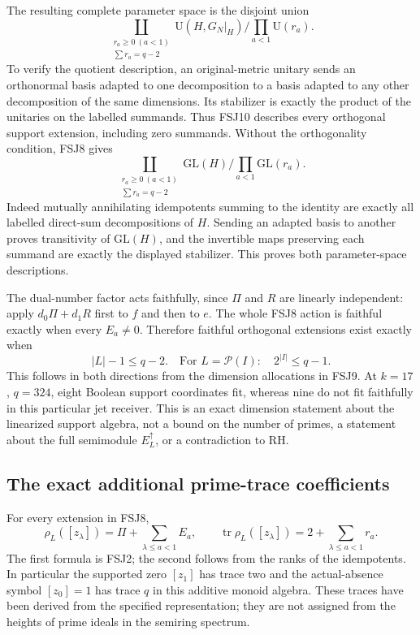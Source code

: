 \documentclass[11pt]{article}
\begin{document}
The resulting complete parameter space is the disjoint union
\[
\coprod_{\substack{r_a\ge0\ (a<1)\\\sum r_a=q-2}}
 \mathrm U(H,G_N|_H)\Big/\prod_{a<1}\mathrm U(r_a).
\tag{FSJ10}
\]
To verify the quotient description, an original-metric unitary sends
an orthonormal basis adapted to one decomposition to a basis adapted
to any other decomposition of the same dimensions. Its stabilizer
is exactly the product of the unitaries on the labelled summands.
Thus FSJ10 describes every orthogonal support extension, including
zero summands. Without the orthogonality condition, FSJ8 gives
\[
\coprod_{\substack{r_a\ge0\ (a<1)\\\sum r_a=q-2}}
 \mathrm{GL}(H)\Big/\prod_{a<1}\mathrm{GL}(r_a).
\tag{FSJ10a}
\]
Indeed mutually annihilating idempotents summing to the identity
are exactly all labelled direct-sum decompositions of $H$. Sending
an adapted basis to another proves transitivity of $\mathrm{GL}(H)$,
and the invertible maps preserving each summand are exactly the
displayed stabilizer. This proves both parameter-space descriptions.

The dual-number factor acts faithfully, since $\Pi$ and $R$ are
linearly independent: apply $d_0\Pi+d_1R$ first to $f$ and then
to $e$. The whole FSJ8 action is faithful exactly when every
$E_a\ne0$. Therefore faithful orthogonal extensions exist exactly when
\[
|L|-1\le q-2.
\quad\text{For }L=\mathcal P(I):\quad 2^{|I|}\le q-1.
\tag{FSJ11}
\]
This follows in both directions from the dimension allocations in
FSJ9. At $k=17$, $q=324$, eight Boolean support coordinates fit,
whereas nine do not fit faithfully in this particular jet receiver.
This is an exact dimension statement about the linearized support
algebra, not a bound on the number of primes, a statement about the
full semimodule $E_L^\uparrow$, or a contradiction to RH.

\subsection{The exact additional prime-trace coefficients}
For every extension in FSJ8,
\[
\rho_L([z_\lambda])=\Pi+\sum_{\lambda\le a<1}E_a,
\qquad
\operatorname{tr}\rho_L([z_\lambda])
 =2+\sum_{\lambda\le a<1}r_a.
\tag{FSJ12}
\]
The first formula is FSJ2; the second follows from the ranks of the
idempotents. In particular the supported zero $[z_1]$ has trace two
and the actual-absence symbol $[z_0]=1$ has trace $q$ in this additive
monoid algebra. These traces have been derived from the specified
representation; they are not assigned from the heights of prime
ideals in the semiring spectrum.
\end{document}
